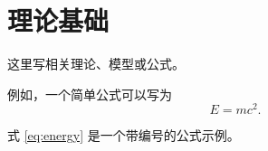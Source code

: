 \section{理论基础}

这里写相关理论、模型或公式。

例如，一个简单公式可以写为\cite{sunExcitonDynamicsTimeResolved2023}
\begin{equation}
  E = mc^2 .
  \label{eq:energy}
\end{equation}

式 \eqref{eq:energy} 是一个带编号的公式示例。

